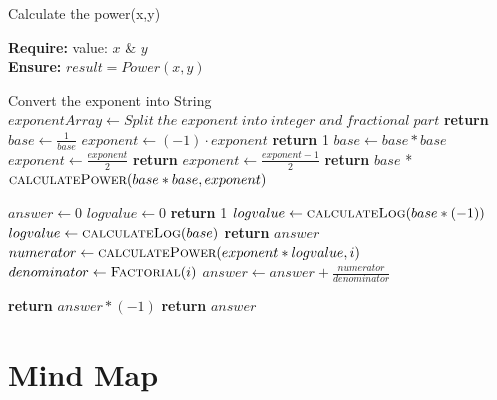 \documentclass[12pt,a4paper]{report}
\begin{document}
\begin{algorithm}
\caption{Calculate the power(x,y)}

\textbf{Require:}  value: $x$ \& $y$  \\
\textbf{Ensure:} $result = Power(x,y)$
\begin{algorithmic}[1]

    \State Convert the exponent into String
    \State $exponentArray \leftarrow Split\;the\;exponent\;into\;integer\;and\;fractional\;part$
    \State \textbf{return} 
    \EndIf
    \State $base \leftarrow \frac{1}{base}$
    \State $exponent \leftarrow (-1) \cdot exponent$
    \EndIf
    \State \textbf{return} 1
    \EndIf
    \State $base \leftarrow base * base$
    \State $exponent \leftarrow \frac{exponent}{2}$
    \State \textbf{return} 
    \Else
    \State $exponent \leftarrow \frac{exponent-1}{2}$
    \State \textbf{return} $base$ * $\Call{calculatePower}{base*base,exponent}$
    \EndIf
    \EndProcedure
\Statex


    \State $answer \leftarrow 0$
    \State $logvalue \leftarrow 0$
    \State \textbf{return} 1
    \EndIf
    \State $logvalue \leftarrow \Call{calculateLog}{base * (-1)}$
    \Else
    \State $logvalue \leftarrow \Call{calculateLog}{base}$
    \EndIf
    \State \textbf{return} $answer$
    \EndIf
    \State $numerator \leftarrow \Call{calculatePower}{exponent*logvalue,i}$
    \State $denominator \leftarrow \Call{Factorial}{i}$
    \State $answer \leftarrow answer + \frac{numerator}{denominator}$
    \EndFor
    
    \State \textbf{return} $answer * (-1)$
    \Else
    \State \textbf{return} $answer$
    \EndIf
    \EndProcedure
\Statex

\end{algorithmic}
\end{algorithm}

\newpage

\section{Mind Map}
\end{document}
